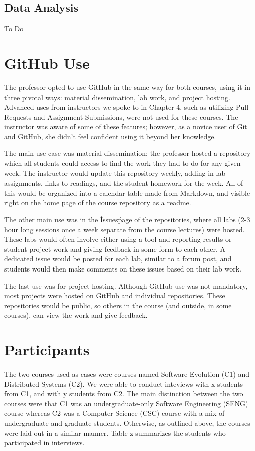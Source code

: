 
\subsection{Data Analysis}
To Do

\section{GitHub Use}
The professor opted to use GitHub in the same way for both courses, using it in three pivotal ways: material dissemination, lab work, and project hosting. Advanced uses from instructors we spoke to in Chapter 4, such as utilizing Pull Requests and Assignment Submissions, were not used for these courses. The instructor was aware of some of these features; however, as a novice user of Git and GitHub, she didn't feel confident using it beyond her knowledge.

The main use case was material dissemination: the professor hosted a repository which all students could access to find the work they had to do for any given week. The instructor would update this repository weekly, adding in lab assignments, links to readings, and the student homework for the week. All of this would be organized into a calendar table made from Markdown, and visible right on the home page of the course repository as a readme.

The other main use was in the \'Issues\' page of the repositories, where all labs (2-3 hour long sessions once a week separate from the course lectures) were hosted. These labs would often involve either using a tool and reporting results or student project work and giving feedback in some form to each other. A dedicated issue would be posted for each lab, similar to a forum post, and students would then make comments on these issues based on their lab work.

The last use was for project hosting. Although GitHub use was not mandatory, most projects were hosted on GitHub and individual repositories. These repositories would be public, so others in the course (and outside, in some courses), can view the work and give feedback. %

\section{Participants}
The two courses used as cases were courses named Software Evolution (C1) and Distributed Systems (C2). We were able to conduct inteviews with x students from C1, and with y students from C2. The main distinction between the two courses were that C1 was an undergraduate-only Software Engineering (SENG) course whereas C2 was a Computer Science (CSC) course with a mix of undergraduate and graduate students. Otherwise, as outlined above, the courses were laid out in a similar manner. Table z summarizes the students who participated in interviews.

